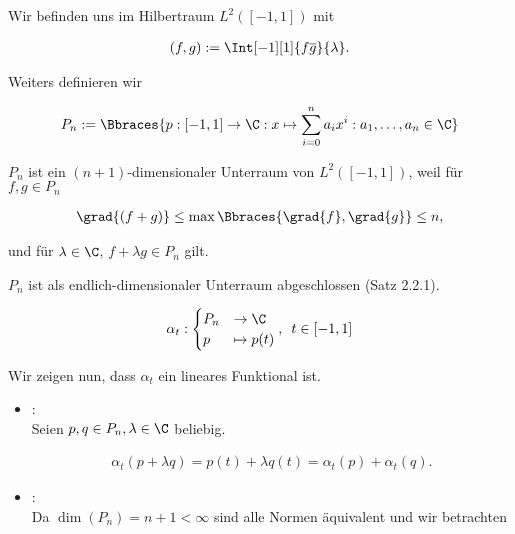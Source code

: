 \begin{solution}

Wir befinden uns im Hilbertraum $L^2([-1, 1])$ mit

\begin{align*}
  (f, g) := \Int[-1][1]{f \overline{g}}{\lambda}.
\end{align*}

Weiters definieren wir

\begin{align*}
  P_n := \Bbraces
  {
    p: [-1, 1] \to \C: x
    \mapsto \sum_{i=0}^n a_i x^i:
    a_1, \ldots, a_n \in \C
  }
\end{align*}

$P_n$ ist ein $(n+1)$-dimensionaler Unterraum von $L^2([-1, 1])$, weil für $f, g \in P_n$

\begin{align*}
  \grad{(f + g)}
  \leq
  \max \Bbraces{\grad{f}, \grad{g}}
  \leq n,
\end{align*}

und für $\lambda \in \C$, $f + \lambda g \in P_n$ gilt.


$P_n$ ist als endlich-dimensionaler Unterraum abgeschlossen (Satz 2.2.1).

\begin{align*}
  \alpha_t:
  \begin{cases}
    P_n & \to \C \\
    p   & \mapsto p(t)
  \end{cases},
  \enspace
  t \in [-1, 1]
\end{align*}

Wir zeigen nun, dass $\alpha_t$ ein lineares Funktional ist.

\begin{itemize}

  \item
  : \\

  Seien $p, q \in P_n, \lambda \in \C$ beliebig.

  \begin{align*}
    \alpha_t(p + \lambda q)
    =
    p(t) + \lambda q(t)
    =
    \alpha_t(p) + \alpha_t(q).
  \end{align*}

  \item
  : \\

  Da $\dim(P_n) = n + 1 < \infty$ sind alle Normen äquivalent und wir betrachten


\end{itemize}
\end{solution}
